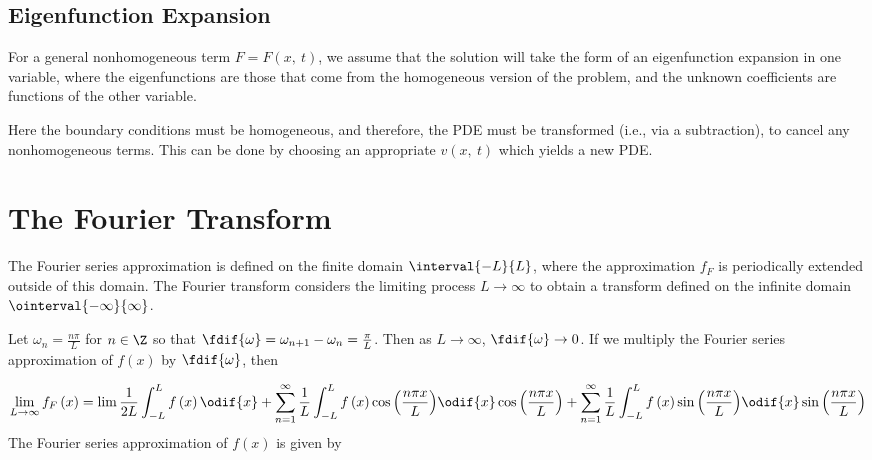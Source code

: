 \documentclass{article}
\begin{document}
\subsection{Eigenfunction Expansion}
For a general nonhomogeneous term \(F = F\left( x,\: t \right)\), we assume that the solution will take
the form of an eigenfunction expansion in one variable, where the eigenfunctions are those that come from the homogeneous
version of the problem, and the unknown coefficients are functions of the other variable.

Here the boundary conditions must be homogeneous, and therefore, the PDE must be
transformed (i.e., via a subtraction), to cancel any nonhomogeneous terms.
This can be done by choosing an appropriate \(v\left( x,\: t \right)\)
which yields a new PDE.
\section{The Fourier Transform}
The Fourier series approximation is defined on the finite domain \(\interval{-L}{L}\), where
the approximation \(f_F\) is periodically extended outside of this domain. The Fourier transform
considers the limiting process \(L \to \infty\) to obtain a transform defined on the infinite domain \(\ointerval{-\infty}{\infty}\).

Let \(\omega_n = \frac{n \pi}{L}\) for \(n \in \Z\) so that \(\fdif{\omega} = \omega_{n + 1} - \omega_n = \frac{\pi}{L}\).
Then as \(L \to \infty\), \(\fdif{\omega} \to 0\). If we multiply the Fourier series approximation of \(f\left( x \right)\) by \(\fdif{\omega}\), then

\begin{equation*}
    \lim_{L \to \infty} f_F\left( x \right) = \lim_{}\frac{1}{2L} \int_{-L}^L f\left( x \right) \odif{x} + \sum_{n = 1}^\infty \frac{1}{L} \int_{-L}^L f\left( x \right) \cos{\left( \frac{n \pi x}{L} \right)} \odif{x} \cos{\left( \frac{n \pi x}{L} \right)} + \sum_{n = 1}^\infty \frac{1}{L} \int_{-L}^L f\left( x \right) \sin{\left( \frac{n \pi x}{L} \right)} \odif{x} \sin{\left( \frac{n \pi x}{L} \right)}
\end{equation*}
The Fourier series approximation of \(f\left( x \right)\) is given by

\end{document}
